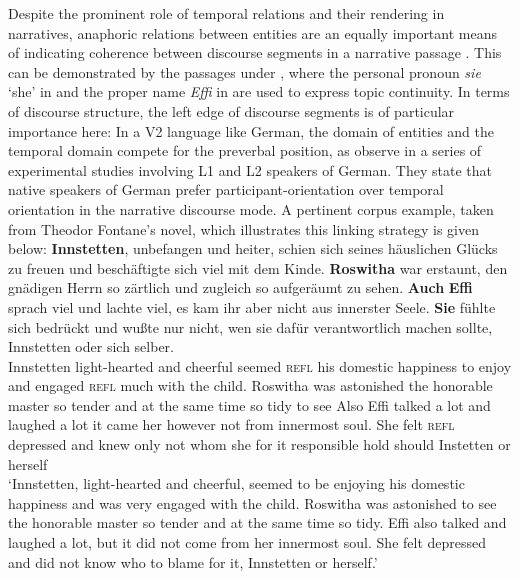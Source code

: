 \documentclass[output=paper,colorlinks,citecolor=brown]{langscibook}
\begin{document}
\noindent
Despite the prominent role of temporal relations and their rendering in narratives, anaphoric relations between entities are an equally important means of indicating coherence between discourse segments in a narrative passage \citep{vonStutt2005subjektwahl,virtanen2011}. This can be demonstrated by the passages under , where the personal pronoun \textit{sie} `she' in  and the proper name \textit{Effi} in   are used to express topic continuity. In terms of discourse structure, the left edge of discourse segments is of particular importance here: In a V2 language like German, the domain of entities and the temporal domain compete for the preverbal position, as \citet{vonStutt2005subjektwahl} observe in a series of experimental studies involving L1 and L2 speakers of German. They state that native speakers of German prefer participant-orientation over temporal orientation in the narrative discourse mode. A pertinent corpus example, taken from Theodor Fontane's novel, which illustrates this linking strategy is given below:
\eal
\gll \textbf{Innstetten}, unbefangen und heiter, schien sich seines häuslichen Glücks zu freuen und beschäftigte sich viel mit dem Kinde. \textbf{Roswitha} war erstaunt, den gnädigen Herrn so zärtlich und zugleich so aufgeräumt zu sehen. \textbf{Auch} \textbf{Effi} sprach viel und lachte viel, es kam ihr aber nicht aus innerster Seele. \textbf{Sie} fühlte sich bedrückt und wu\ss{}te nur nicht, wen sie dafür verantwortlich machen sollte, Innstetten oder {sich selber}. \\ Innstetten light-hearted and cheerful seemed \textsc{refl} his domestic happiness to enjoy and engaged \textsc{refl} much with the child. Roswitha was astonished the honorable master so tender and {at the same time} so tidy to see Also Effi talked {a lot} and laughed {a lot} it came her however not from innermost soul. She felt \textsc{refl} depressed and knew only not whom she {for it} responsible hold should Instetten or herself   \\
\glt `Innstetten, light-hearted and cheerful, seemed to be enjoying his domestic happiness and was very engaged with the child. Roswitha was astonished to see the honorable master so tender and at the same time so tidy. Effi also talked and laughed a lot, but it did not come from her innermost soul. She felt depressed and did not know who to blame for it, Innstetten or herself.'
\zl
\end{document}
